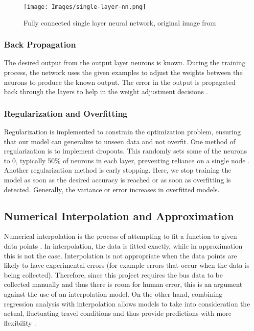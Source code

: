 \begin{figure}[H]
\begin{center}
    \texttt{[image: Images/single-layer-nn.png]}
    \caption{Fully connected single layer neural network, original image from \cite{methods-for-ds-slides}}
    \label{fig:nn-architecture}
\end{center}
\end{figure}

\subsubsection{Back Propagation}

The desired output from the output layer neurons is known. During the training process, the network uses the given examples to adjust the weights between the neurons to produce the known output. The error in the output is propagated back through the layers to help in the weight adjustment decisions \cite{ann-prediction}.

\subsubsection{Regularization and Overfitting}

Regularization is implemented to constrain the optimization problem, ensuring that our model can generalize to unseen data and not overfit. One method of regularization is to implement dropouts. This randomly sets some of the neurons to 0, typically 50\% of neurons in each layer, preventing reliance on a single node \cite{methods-for-ds-slides}. Another regularization method is early stopping. Here, we stop training the model as soon as the desired accuracy is reached or as soon as overfitting is detected. Generally, the variance or error increases in overfitted models. 

\subsection{Numerical Interpolation and Approximation}

Numerical interpolation is the process of attempting to fit a function to given data points \cite{intro-to-numerical-analysis-atkinson}. In interpolation, the data is fitted exactly, while in approximation this is not the case. Interpolation is not appropriate when the data points are likely to have experimental errors (for example errors that occur when the data is being collected). Therefore, since this project requires the bus data to be collected manually and thus there is room for human error, this is an argument against the use of an interpolation model. On the other hand, combining regression analysis with interpolation allows models to take into consideration the actual, fluctuating travel conditions and thus provide predictions with more flexibility \cite{aviation-regression-interpolation}.

